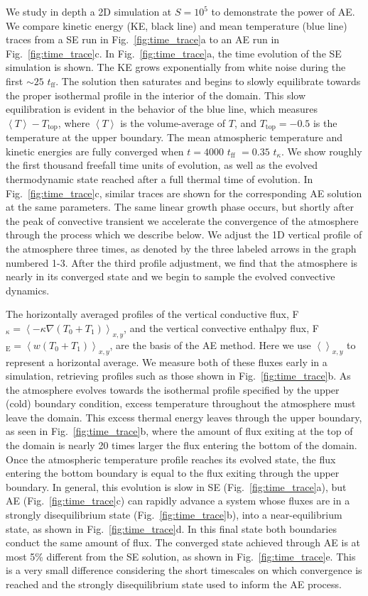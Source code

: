 \documentclass[aps, pre, onecolumn, nofootinbib, notitlepage, groupedaddress, amsfonts, amssymb, amsmath, longbibliography]{revtex4-1}
\newcommand{\angles}[1]{\ensuremath{\left\langle #1 \right\rangle}}
\newcommand{\grad}{\ensuremath{\nabla}}
\begin{document}
We study in depth a 2D simulation at $S = 10^5$ to demonstrate the power of AE.
We compare kinetic energy (KE, black line) and mean temperature (blue line)
traces from a SE run in Fig.~\ref{fig:time_trace}a to an AE run
in Fig.~\ref{fig:time_trace}c.
In Fig.~\ref{fig:time_trace}a, the time evolution of the SE simulation is shown.
The KE grows exponentially from white noise during the
first $\sim 25$ $t_{\text{ff}}$. The solution then saturates and begins to slowly
equilibrate towards the proper isothermal profile in the interior of the domain.
This slow equilibration is evident in the behavior of the blue line, which measures
$\angles{T} - T_{\text{top}}$, where \angles{T} is the volume-average of $T$, and
$T_{\text{top}} = -0.5$ is the temperature at the upper boundary.
The mean atmospheric temperature and
kinetic energies are fully converged when $t = 4000$ $t_{\text{ff}}$ $= 0.35$ $t_{\kappa}$.
We show roughly the first thousand freefall time
units of evolution, as well as the evolved thermodynamic state reached after a full
thermal time of evolution.  In Fig.~\ref{fig:time_trace}c, similar traces are
shown for the corresponding AE solution
at the same parameters. The same linear growth phase occurs, but shortly after
the peak of convective transient we accelerate the convergence of the atmosphere
through the process which we describe below. We adjust the 1D vertical profile of
the atmosphere three times, as denoted by the three labeled
arrows in the graph numbered 1-3.  After the third profile adjustment, we find that
the atmosphere is nearly in its converged state and we begin to sample the evolved
convective dynamics.

The horizontally averaged profiles of the vertical conductive flux, 
F$_{\kappa} = \angles{-\kappa\grad(T_0 + T_1)}_{x,y}$, and the vertical convective enthalpy flux,
F$_{\text{E}} = \angles{w(T_0 + T_1)}_{x,y}$, are the basis of the AE method.
Here we use $\angles{}_{x,y}$ to represent a horizontal average. We measure
both of these fluxes early in a simulation, retrieving profiles such as
those shown in Fig.~\ref{fig:time_trace}b.
As the atmosphere evolves towards
the isothermal profile specified by the upper (cold) boundary condition, excess
temperature throughout the atmosphere must leave the domain. This excess thermal
energy leaves through the upper boundary, as seen in 
Fig.~\ref{fig:time_trace}b, where the amount of flux exiting at the top of the domain
is nearly 20 times larger the flux entering the bottom of the domain. Once the atmospheric
temperature profile reaches its evolved state, the flux entering the bottom boundary
is equal to the flux exiting through the upper boundary.  In general, this 
evolution is slow in SE (Fig.~\ref{fig:time_trace}a), but AE (Fig.~\ref{fig:time_trace}c)
can rapidly advance a system whose fluxes are in a strongly disequilibrium state (Fig.~\ref{fig:time_trace}b),
into a near-equilibrium state, as shown in Fig.~\ref{fig:time_trace}d. In
this final state both boundaries conduct the same amount of flux.
The converged state achieved through AE is at most 5\% different from the SE solution, 
as shown in Fig.~\ref{fig:time_trace}e. 
This is a very small difference considering the short timescales on which convergence
is reached and the strongly disequilibrium state used to inform the AE process.
\end{document}
